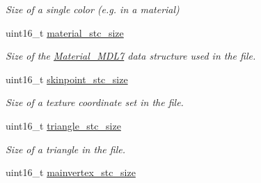 \begin{DoxyCompactItemize}
\begin{DoxyCompactList}\small\item\em Size of a single color (e.\+g. in a material) \end{DoxyCompactList}\item 
\hypertarget{struct_assimp_1_1_m_d_l_1_1_header___m_d_l7_ad60a8a414bb376ccd51dcb64cf59708d}{uint16\+\_\+t \hyperlink{struct_assimp_1_1_m_d_l_1_1_header___m_d_l7_ad60a8a414bb376ccd51dcb64cf59708d}{material\+\_\+stc\+\_\+size}}\label{struct_assimp_1_1_m_d_l_1_1_header___m_d_l7_ad60a8a414bb376ccd51dcb64cf59708d}

\begin{DoxyCompactList}\small\item\em Size of the \hyperlink{struct_assimp_1_1_m_d_l_1_1_material___m_d_l7}{Material\+\_\+\+M\+D\+L7} data structure used in the file. \end{DoxyCompactList}\item 
\hypertarget{struct_assimp_1_1_m_d_l_1_1_header___m_d_l7_a99f81a44fb255fd87414b73fd1979dd5}{uint16\+\_\+t \hyperlink{struct_assimp_1_1_m_d_l_1_1_header___m_d_l7_a99f81a44fb255fd87414b73fd1979dd5}{skinpoint\+\_\+stc\+\_\+size}}\label{struct_assimp_1_1_m_d_l_1_1_header___m_d_l7_a99f81a44fb255fd87414b73fd1979dd5}

\begin{DoxyCompactList}\small\item\em Size of a texture coordinate set in the file. \end{DoxyCompactList}\item 
\hypertarget{struct_assimp_1_1_m_d_l_1_1_header___m_d_l7_a42beed4d2fa61b3d75184e032f0b0dfb}{uint16\+\_\+t \hyperlink{struct_assimp_1_1_m_d_l_1_1_header___m_d_l7_a42beed4d2fa61b3d75184e032f0b0dfb}{triangle\+\_\+stc\+\_\+size}}\label{struct_assimp_1_1_m_d_l_1_1_header___m_d_l7_a42beed4d2fa61b3d75184e032f0b0dfb}

\begin{DoxyCompactList}\small\item\em Size of a triangle in the file. \end{DoxyCompactList}\item 
\hypertarget{struct_assimp_1_1_m_d_l_1_1_header___m_d_l7_a7bb4d3374c9abc8500ea69d5a4c88577}{uint16\+\_\+t \hyperlink{struct_assimp_1_1_m_d_l_1_1_header___m_d_l7_a7bb4d3374c9abc8500ea69d5a4c88577}{mainvertex\+\_\+stc\+\_\+size}}\label{struct_assimp_1_1_m_d_l_1_1_header___m_d_l7_a7bb4d3374c9abc8500ea69d5a4c88577}


\end{DoxyCompactItemize}
